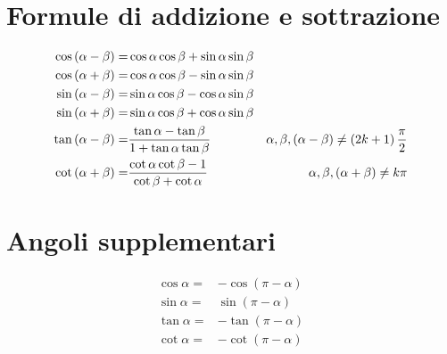 \section{Formule di addizione e sottrazione}\label{sec:formule-di-addizione}
\begin{align*}
\cos\left(\alpha-\beta\right)=&{}\cos\alpha\cos\beta+\sin\alpha\sin\beta\\\index{Coseno!differenza!angoli}
\cos\left(\alpha+\beta\right)=&{}\cos\alpha\cos\beta-\sin\alpha\sin\beta\\\index{Coseno!somma!angoli}
\sin\left(\alpha-\beta\right)=&{}\sin\alpha\cos\beta-\cos\alpha\sin\beta\\\index{Seno!differenza angoli}
\sin\left(\alpha+\beta\right)=&{}\sin\alpha\cos\beta+\cos\alpha\sin\beta\\\index{Seno!somma!angoli}
\tan\left(\alpha-\beta\right)=&{}\dfrac{\tan\alpha-\tan\beta}{1+\tan\alpha\tan\beta} &\alpha,\beta,\left(\alpha-\beta\right)\neq\left(2k+1\right)\dfrac{\pi}{2}\\\index{Tangente!differenza!angoli}
\cot\left(\alpha+\beta\right)=&{}\dfrac{\cot\alpha\cot\beta-1}{\cot\beta+\cot\alpha}
&\alpha,\beta,\left(\alpha+\beta\right)\neq k\pi\index{Cotangente!somma!angoli}
\end{align*}
\section{Angoli supplementari}\label{sec:angoli-supplementari}
\begin{align*}
\cos\alpha=&-\cos(\pi-\alpha)\\
\sin\alpha=&\sin(\pi-\alpha)\\
\tan\alpha=&-\tan(\pi-\alpha)\\
\cot\alpha=&-\cot(\pi-\alpha)
\end{align*}
